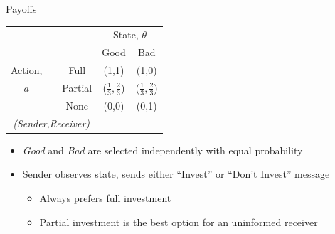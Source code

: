 \documentclass{beamer}
\begin{document}
\begin{frame}{Payoffs}
	\begin{center}%
		\begin{tabular}{c|cc|c|c|}
		\multicolumn{1}{c}{} &  & \multicolumn{1}{c}{} & \multicolumn{2}{c}{State, $\theta$} \\ 
		\cline{4-5} 
		\multicolumn{1}{c}{} &  & \multicolumn{1}{c}{} & \multicolumn{1}{c}{Good} & \multicolumn{1}{c}{Bad} \\ 
		\cline{4-5} 
		Action, &  & Full & (1,1) & (1,0) \\ 
		\cline{4-5} 
		$a$ &  & Partial & ($\frac{1}{3},\frac{2}{3}$) & ($\frac{1}{3},\frac{2}{3}$) \\ 
		\cline{4-5} 
		 &  & None & (0,0) & (0,1) \\ 
		\cline{4-5} 
		\multicolumn{3}{c}{\emph{(Sender,Receiver)}} & \multicolumn{1}{c}{} & \multicolumn{1}{c}{} \\ 
		\end{tabular}
	\end{center}
	
	\begin{itemize}
		\item \emph{Good} and \emph{Bad} are selected independently with equal probability
		\item Sender observes state, sends either ``Invest'' or ``Don't Invest''
	message
		\begin{itemize}
			\item Always prefers full investment
			\item Partial investment is the best option for an uninformed receiver
		\end{itemize}
	\end{itemize}
\end{frame}
\end{document}
